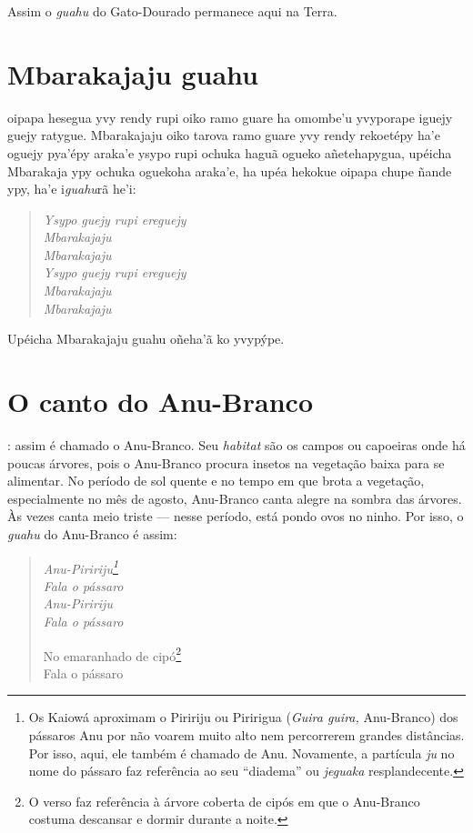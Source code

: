 Assim o \emph{guahu} do Gato-Dourado permanece aqui na Terra.

\chapter{Mbarakajaju guahu}

 oipapa hesegua yvy rendy rupi oiko ramo guare ha omombe'u
yvyporape iguejy guejy ratygue. Mbarakajaju oiko tarova ramo guare yvy
rendy rekoetépy ha'e oguejy pya'épy araka'e ysypo rupi ochuka haguã
ogueko añetehapygua, upéicha Mbarakaja ypy ochuka oguekoha araka'e, ha
upéa hekokue oipapa chupe ñande ypy, ha'e i\emph{guahu}rã he'i:

\begin{verse}
\itshape
Ysypo guejy rupi ereguejy\\
Mbarakajaju\\
Mbarakajaju\\

Ysypo guejy rupi ereguejy\\
Mbarakajaju\\
Mbarakajaju
\end{verse}

Upéicha Mbarakajaju guahu oñeha'ã ko yvypýpe.

\chapter{O canto do Anu-Branco}

: assim é chamado o Anu-Branco. Seu \emph{habitat} são os campos
ou capoeiras onde há poucas árvores, pois o Anu-Branco procura insetos
na vegetação baixa para se alimentar. No período de sol quente e no
tempo em que brota a vegetação, especialmente no mês de agosto,
Anu-Branco canta alegre na sombra das árvores. Às vezes canta meio
triste --- nesse período, está pondo ovos no ninho. Por isso, o
\emph{guahu} do Anu-Branco é assim:

\begin{verse}
\itshape
\emph{Anu-Piririju}\footnote{Os Kaiowá aproximam o Piririju ou Piririgua (\emph{Guira
  guira,} Anu-Branco) dos pássaros Anu por não voarem muito alto nem
  percorrerem grandes distâncias. Por isso, aqui, ele também é chamado
  de Anu. Novamente, a partícula \emph{ju} no nome do pássaro faz referência ao
  seu ``diadema'' ou \emph{jeguaka} resplandecente.}\\
Fala o pássaro\\
\emph{Anu-Piririju}\\
Fala o pássaro

No emaranhado de cipó\footnote{O verso faz referência à árvore coberta de cipós em que o
  Anu-Branco costuma descansar e dormir durante a noite.}\\
Fala o pássaro
\end{verse}

